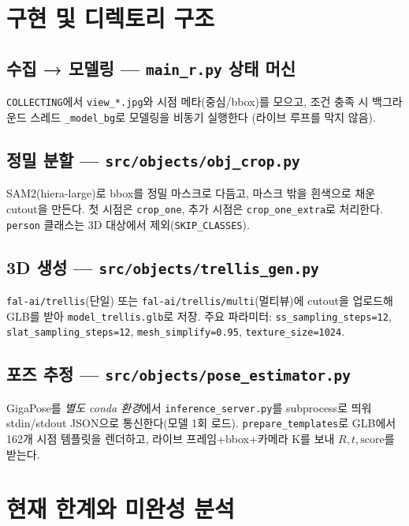 \chapter{구현 및 디렉토리 구조}

\section{수집 → 모델링 — \texttt{main\_r.py} 상태 머신}
\texttt{COLLECTING}에서 \texttt{view\_*.jpg}와 시점 메타(중심/bbox)를 모으고,
조건 충족 시 백그라운드 스레드 \texttt{\_model\_bg}로 모델링을 비동기 실행한다
(라이브 루프를 막지 않음).

\section{정밀 분할 — \texttt{src/objects/obj\_crop.py}}
SAM2(hiera-large)로 bbox를 정밀 마스크로 다듬고, 마스크 밖을 흰색으로 채운
cutout을 만든다. 첫 시점은 \texttt{crop\_one}, 추가 시점은 \texttt{crop\_one\_extra}로
처리한다. \texttt{person} 클래스는 3D 대상에서 제외(\texttt{SKIP\_CLASSES}).

\section{3D 생성 — \texttt{src/objects/trellis\_gen.py}}
\texttt{fal-ai/trellis}(단일) 또는 \texttt{fal-ai/trellis/multi}(멀티뷰)에 cutout을
업로드해 GLB를 받아 \texttt{model\_trellis.glb}로 저장. 주요 파라미터:
\texttt{ss\_sampling\_steps=12}, \texttt{slat\_sampling\_steps=12},
\texttt{mesh\_simplify=0.95}, \texttt{texture\_size=1024}.

\section{포즈 추정 — \texttt{src/objects/pose\_estimator.py}}
GigaPose를 \emph{별도 conda 환경}에서 \texttt{inference\_server.py}를 subprocess로
띄워 stdin/stdout JSON으로 통신한다(모델 1회 로드). \texttt{prepare\_templates}로
GLB에서 162개 시점 템플릿을 렌더하고, 라이브 프레임+bbox+카메라 K를 보내
$R, t, \text{score}$를 받는다.

\chapter{현재 한계와 미완성 분석}

\begin{statustodo}[ — GigaPose 포즈]\end{statustodo}

